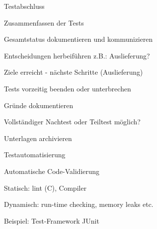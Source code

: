 \documentclass[a4paper]{article}
\begin{document}
\begin{multicols}{3}

  Testabschluss
  \begin{itemize*}
    \item Zusammenfassen der Tests
    \item Gesamtstatus dokumentieren und kommunizieren
    \item Entscheidungen herbeiführen z.B.: Auslieferung?
          \begin{itemize*}
            \item Ziele erreicht - nächste Schritte (Auslieferung)
            \item Tests vorzeitig beenden oder unterbrechen
            \item Gründe dokumentieren
            \item Vollständiger Nachtest oder Teiltest möglich?
          \end{itemize*}
    \item Unterlagen archivieren
  \end{itemize*}

  Testautomatisierung
  \begin{itemize*}
    \item Automatische Code-Validierung
          \begin{itemize*}
            \item Statisch: lint (C), Compiler
            \item Dynamisch: run-time checking, memory leaks etc.
          \end{itemize*}
    \item Beispiel: Test-Framework JUnit
  \end{itemize*}


\end{multicols}
\end{document}
